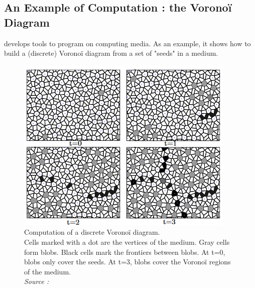 \documentclass{article}
\begin{document}
\subsection{An Example of Computation : the Voronoï Diagram}

\cite{Voronoi} develops tools to program on computing media. As an example, it shows how to build a (discrete) Voronoï diagram from a set of "seeds" in a medium.

\begin{figure}[H]
	\centering\includegraphics[width=0.7\linewidth]{assets/voronoi_spread.png}
	\caption{
		Computation of a discrete Voronoï diagram.\\
		Cells marked with a dot are the vertices of the medium.
		Gray cells form blobs. Black cells mark the frontiers between blobs. At t=0, blobs only cover the seeds. At t=3, blobs cover the Voronoï regions of the medium.\\
		\textit{Source : \cite{Voronoi}}
	}
	\label{fig:voronoi_spread}
\end{figure}
\end{document}

